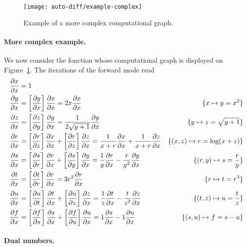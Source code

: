 \begin{figure}
\centering
\texttt{[image: auto-diff/example-complex]}
\caption{\label{fig-dag-example-complex}
Example of a more complex computational graph.
}
\end{figure}

\paragraph{More complex example.}

We now consider the fonction 
whose computational graph is displayed on Figure~\ref{fig-dag-example-complex}. The iterations of the forward mode read
\begin{align*}
		\pd{x}{x} &= 1 \\
		\pd{y}{x} &= \pdb{y}{x} \pd{x}{x}  = 2 x \pd{x}{x}  &
			\{x \mapsto y = x^2\} \\
		\pd{z}{x} &= \pdb{z}{y} \pd{y}{x} = \frac{1}{2\sqrt{y+1}} \pd{y}{x} &
			\{y \mapsto z=\sqrt{y+1}\}\\
		\pd{r}{x} &= \pdb{r}{z} \pd{x}{x} + \pdb{r}{z} \pd{z}{x} = \frac{1}{x+r} \pd{x}{x} + \frac{1}{x+r} \pd{z}{x}&
			\{(x,z) \mapsto r=\log(x+z)\} \\
		\pd{s}{x} &= \pdb{s}{r} \pd{r}{x} + \pdb{s}{y}\pd{y}{x} = \frac{1}{y} \pd{r}{x} - \frac{r}{y^2}\pd{y}{x} &
			\{ (r,y) \mapsto s=\frac{r}{y}  \} \\
		\pd{t}{x} &= \pdb{t}{r} \pd{r}{x} = 3r^2 \pd{r}{x} &
			\{ r \mapsto t = r^3 \} \\
		\pd{u}{x} &= \pdb{u}{t} \pd{t}{x} + \pdb{u}{z}\pd{z}{x} = \frac{1}{z} \pd{t}{x} - \frac{t}{z^2} \pd{z}{x} &
			\{ (t,z) \mapsto u =  \frac{t}{z}  \} \\
		\pd{f}{x} &= \pdb{f}{s}\pd{s}{x} + \pdb{f}{u}\pd{u}{x} = 1 \pd{s}{x} - 1 \pd{u}{x} &
			\{ (s,u) \mapsto f = s-u \}
\end{align*}
\fi


\paragraph{Dual numbers.}

